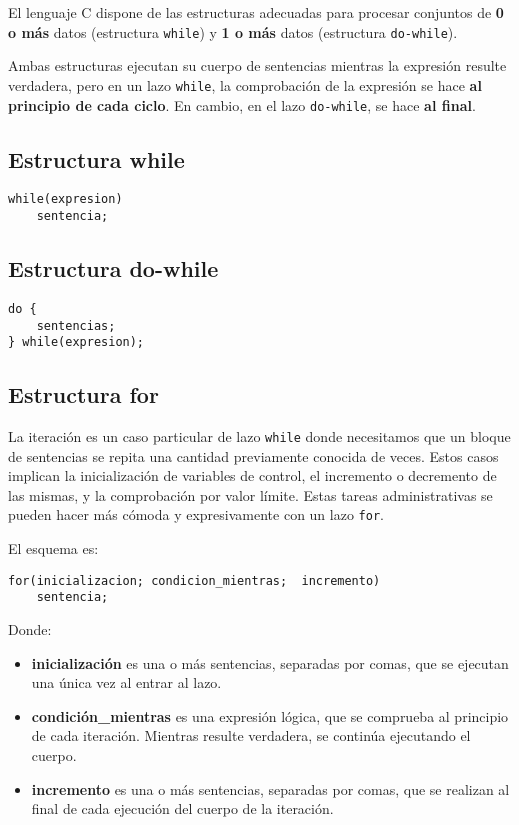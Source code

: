 El lenguaje C dispone de las estructuras adecuadas para procesar conjuntos de \textbf{0 o más}
datos (estructura \texttt{while}) y \textbf{1 o más} datos (estructura \texttt{do-while}).

Ambas estructuras ejecutan su cuerpo de sentencias mientras la expresión
resulte verdadera, pero en un lazo \texttt{while}, la comprobación de la expresión se hace \textbf{al principio de cada
ciclo}. En cambio, en el lazo \texttt{do-while}, se hace \textbf{al final}.


\subsection{Estructura while}
\begin{lstlisting}
while(expresion)
    sentencia;
\end{lstlisting}

\subsection{Estructura do-while}
\begin{lstlisting}
do {
    sentencias;
} while(expresion);
\end{lstlisting}


\subsection{Estructura for}

La iteración es un caso particular de lazo \texttt{while} donde necesitamos que un
bloque de sentencias se repita una cantidad previamente conocida de veces.
Estos casos implican la inicialización de variables de control, el incremento o
decremento de las mismas, y la comprobación por valor límite.
Estas tareas administrativas se pueden hacer más cómoda y expresivamente con un
lazo \texttt{for}. 

El esquema es:
\begin{lstlisting}
for(inicializacion; condicion_mientras;  incremento)
    sentencia;
\end{lstlisting}

Donde:
\begin{itemize}
	\item \textbf{inicialización} es una o más sentencias, separadas por comas, que se
      ejecutan una única vez al entrar al lazo.
	\item \textbf{condición\_mientras} es una expresión lógica, que se comprueba al principio
      de cada iteración. Mientras resulte verdadera, se continúa ejecutando el
      cuerpo.
	\item \textbf{incremento} es una o más sentencias, separadas por comas, que se realizan
      al final de cada ejecución del cuerpo de la iteración. 
\end{itemize}
    
